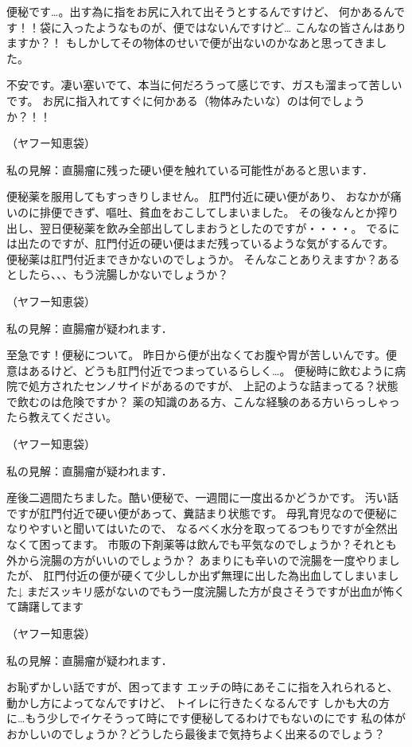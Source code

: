 便秘です…。出す為に指をお尻に入れて出そうとするんですけど、
何かあるんです！！袋に入ったようなものが、便ではないんですけど…
こんなの皆さんはありますか？！
もしかしてその物体のせいで便が出ないのかなあと思ってきました。

不安です。凄い塞いでて、本当に何だろうって感じです、ガスも溜まって苦しいです。
お尻に指入れてすぐに何かある（物体みたいな）のは何でしょうか？！！

（ヤフー知恵袋）


私の見解：直腸瘤に残った硬い便を触れている可能性があると思います． 

便秘薬を服用してもすっきりしません。 肛門付近に硬い便があり、
おなかが痛いのに排便できず、嘔吐、貧血をおこしてしまいました。
その後なんとか搾り出し、翌日便秘薬を飲み全部出してしまおうとしたのですが・・・・。
でるには出たのですが、肛門付近の硬い便はまだ残っているような気がするんです。
便秘薬は肛門付近まできかないのでしょうか。
そんなことありえますか？あるとしたら、、、もう浣腸しかないでしょうか？

（ヤフー知恵袋）


私の見解：直腸瘤が疑われます． 

至急です！便秘について。
昨日から便が出なくてお腹や胃が苦しいんです。便意はあるけど、どうも肛門付近でつまっているらしく…。
便秘時に飲むように病院で処方されたセンノサイドがあるのですが、
上記のような詰まってる？状態で飲むのは危険ですか？
薬の知識のある方、こんな経験のある方いらっしゃったら教えてください。

（ヤフー知恵袋）


私の見解：直腸瘤が疑われます． 

産後二週間たちました。酷い便秘で、一週間に一度出るかどうかです。
汚い話ですが肛門付近で硬い便があって、糞詰まり状態です。
母乳育児なので便秘になりやすいと聞いてはいたので、
なるべく水分を取ってるつもりですが全然出なくて困ってます。
市販の下剤薬等は飲んでも平気なのでしょうか？それとも外から浣腸の方がいいのでしょうか？
あまりにも辛いので浣腸を一度やりましたが、
肛門付近の便が硬くて少ししか出ず無理に出した為出血してしまいました↓
まだスッキリ感がないのでもう一度浣腸した方が良さそうですが出血が怖くて躊躇してます

（ヤフー知恵袋）


私の見解：直腸瘤が疑われます． 

お恥ずかしい話ですが、困ってます
エッチの時にあそこに指を入れられると、
動かし方によってなんですけど、 トイレに行きたくなるんです 
しかも大の方に…もう少しでイケそうって時にです便秘してるわけでもないのにです 
私の体がおかしいのでしょうか？どうしたら最後まで気持ちよく出来るのでしょう？

